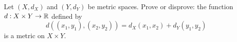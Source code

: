 \begin{comment}

\ExerciseSolution Let $C_A$ be a closed subset of $A$. Then $C_A = A \setminus O_A$ for some open set $O_A$ in $A$. Since $O_A$ is open in $A$, there exists an open set $O_X$ in $X$ such that $O_A = A \cap O_X$. Then $C_X = X \setminus O_X$ is a closed set in $X$. We will show that $C_A = A \cap C_X$. 

Let $c \in C_A$. Then $c \in A$ and $c \notin O_A$. Since $c \in A$, we also have $c \in X$. Now $c \in A$ but not in $O_A$, so $c$ cannot be in $O_X$. Thus, $c \in (X \setminus O_X) = C_X$. The fact that $c \in A$ implies that $c \in (A \cap C_X)$. 

Now suppose that $c \in (A \cap C_X)$. Then $c \in A$ and $c \in C_X$. Since $c \in C_X$, it follows that $c \in (X \setminus O_X)$. Thus, $c \notin O_X$. But $O_A \subseteq O_X$, so $c \notin O_A$. We conclude that $c \in (A \setminus O_A) = C_A$.  Therefore, $C_A = A \cap C_X$. 

Now suppose that $C_A = A \cap C_X$ for some closed subset $C_X$ of $X$. We will show that $C_A$ is closed in $A$ by showing that $C_A = A \setminus O_A$ for some open set $O_A$ in $A$. The fact that $C_X$ is closed in $X$ means that $O_X = X \setminus C_X$ is an open set in $X$. Then $O_A = A \cap O_X$ is an open set in $A$. We demonstrate that $C_A = A \setminus O_A$. 

Let $c \in C_A$. Then $c \in (A \cap C_X)$. So $c \in A$ and $c \in C_X$. Thus, $c \notin (X \setminus C_X) = O_X$. It follows that $c \notin O_A$. So $c \in A$ and $c \notin O_A$, which means that $c \in (A \setminus O_A)$. 

Finally, suppose that $c \in (A \setminus O_A)$. Then $c \in A$ and $c \notin O_A$. Since $c \notin O_A$, it follows that $c \notin O_X$. So $c \in (X \setminus O_X) = C_X$ and $c \in (A \cap C_X) = C_A$. We conclude that $C_A = A \setminus O_A$.


\end{comment}

\item Let $(X,d_X)$ and $(Y,d_Y)$ be metric spaces. Prove or disprove: the function $d: X \times Y \to \mathbb{R}$ defined by 
\[d((x_1,y_1), (x_2,y_2)) = d_X(x_1,x_2) + d_Y(y_1,y_2)\]
is a metric on $X \times Y$. 

